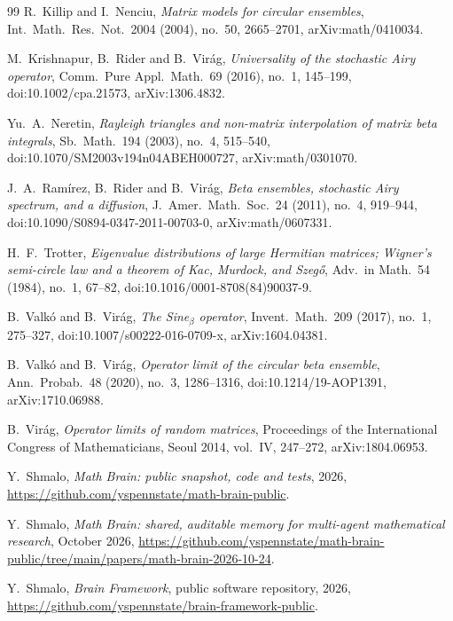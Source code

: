 \documentclass[10pt]{amsart}
\begin{document}
\begin{thebibliography}{99}
 R.~Killip and I.~Nenciu, \emph{Matrix models for circular ensembles}, Int.\ Math.\ Res.\ Not.\ 2004 (2004), no.~50, 2665--2701, arXiv:math/0410034.

 M.~Krishnapur, B.~Rider and B.~Vir\'ag, \emph{Universality of the stochastic Airy operator}, Comm.\ Pure Appl.\ Math.\ 69 (2016), no.~1, 145--199, doi:10.1002/cpa.21573, arXiv:1306.4832.

 Yu.~A.~Neretin, \emph{Rayleigh triangles and non-matrix interpolation of matrix beta integrals}, Sb.\ Math.\ 194 (2003), no.~4, 515--540, doi:10.1070/SM2003v194n04ABEH000727, arXiv:math/0301070.

 J.~A.~Ram\'irez, B.~Rider and B.~Vir\'ag, \emph{Beta ensembles, stochastic Airy spectrum, and a diffusion}, J.\ Amer.\ Math.\ Soc.\ 24 (2011), no.~4, 919--944, doi:10.1090/S0894-0347-2011-00703-0, arXiv:math/0607331.

 H.~F.~Trotter, \emph{Eigenvalue distributions of large Hermitian matrices; Wigner's semi-circle law and a theorem of Kac, Murdock, and Szeg\H{o}}, Adv.\ in Math.\ 54 (1984), no.~1, 67--82, doi:10.1016/0001-8708(84)90037-9.

 B.~Valk\'o and B.~Vir\'ag, \emph{The Sine$_\beta$ operator}, Invent.\ Math.\ 209 (2017), no.~1, 275--327, doi:10.1007/s00222-016-0709-x, arXiv:1604.04381.

 B.~Valk\'o and B.~Vir\'ag, \emph{Operator limit of the circular beta ensemble}, Ann.\ Probab.\ 48 (2020), no.~3, 1286--1316, doi:10.1214/19-AOP1391, arXiv:1710.06988.

 B.~Vir\'ag, \emph{Operator limits of random matrices}, Proceedings of the International Congress of Mathematicians, Seoul 2014, vol.~IV, 247--272, arXiv:1804.06953.

 Y.~Shmalo, \emph{Math Brain: public snapshot, code and tests}, 2026, \url{https://github.com/yspennstate/math-brain-public}.

 Y.~Shmalo, \emph{Math Brain: shared, auditable memory for multi-agent mathematical research}, October 2026, \url{https://github.com/yspennstate/math-brain-public/tree/main/papers/math-brain-2026-10-24}.

 Y.~Shmalo, \emph{Brain Framework}, public software repository, 2026, \url{https://github.com/yspennstate/brain-framework-public}.

\end{thebibliography}
\end{document}
